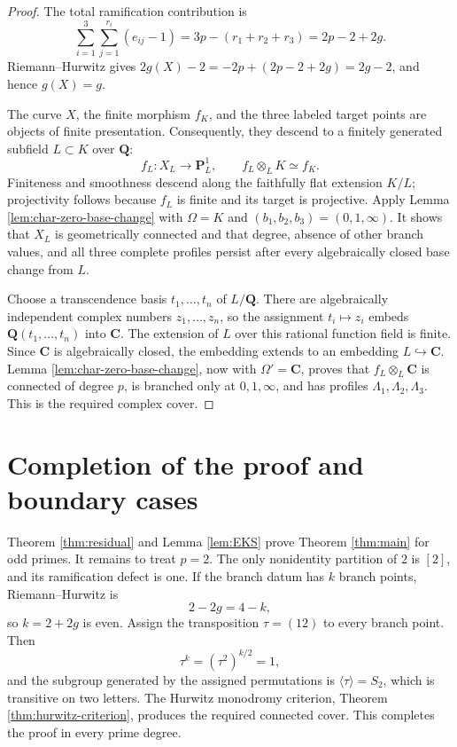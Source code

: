 \documentclass[11pt]{amsart}
\theoremstyle{plain}
\theoremstyle{definition}
\numberwithin{equation}{section}
\begin{document}
\begin{proof}
The total ramification contribution is
\[
 \sum_{i=1}^{3}\sum_{j=1}^{r_i}(e_{ij}-1)
 =3p-(r_1+r_2+r_3)=2p-2+2g.
\]
Riemann--Hurwitz gives $2g(X)-2=-2p+(2p-2+2g)=2g-2$,
and hence $g(X)=g$.

The curve $X$, the finite morphism $f_K$, and the three labeled target
points are objects of finite presentation.  Consequently, they descend to
a finitely generated subfield $L\subset K$ over $\mathbf Q$:
\[
 f_L:X_L\longrightarrow\mathbf P^1_L,
 \qquad
 f_L\otimes_L K\simeq f_K.
\]
Finiteness and smoothness descend along the faithfully flat extension
$K/L$; projectivity follows because $f_L$ is finite and its target is
projective.  Apply Lemma \ref{lem:char-zero-base-change} with
$\Omega=K$ and $(b_1,b_2,b_3)=(0,1,\infty)$.  It shows that $X_L$ is
geometrically connected and that degree, absence of other branch values,
and all three complete profiles persist after every algebraically closed
base change from $L$.

Choose a transcendence basis $t_1,\ldots,t_n$ of $L/\mathbf Q$.  There are
algebraically independent complex numbers $z_1,\ldots,z_n$, so the
assignment $t_i\mapsto z_i$ embeds
$\mathbf Q(t_1,\ldots,t_n)$ into $\mathbf C$.  The extension of $L$ over
this rational function field is finite.  Since $\mathbf C$ is algebraically
closed, the embedding extends to an embedding $L\hookrightarrow\mathbf C$.
Lemma \ref{lem:char-zero-base-change}, now with $\Omega'=\mathbf C$, proves
that $f_L\otimes_L\mathbf C$ is connected of degree $p$, is branched only
at $0,1,\infty$, and has profiles
$\Lambda_1,\Lambda_2,\Lambda_3$.  This is the required complex cover.
\end{proof}

\section{Completion of the proof and boundary cases}

Theorem \ref{thm:residual} and Lemma \ref{lem:EKS} prove Theorem
\ref{thm:main} for odd primes.  It remains to treat $p=2$.  The only
nonidentity partition of $2$ is $[2]$, and its ramification defect is one.
If the branch datum has $k$ branch points, Riemann--Hurwitz is
\[
 2-2g=4-k,
\]
so $k=2+2g$ is even.  Assign the transposition $\tau=(12)$ to every branch
point.  Then
\[
 \tau^k=(\tau^2)^{k/2}=1,
\]
and the subgroup generated by the assigned permutations is
$\langle\tau\rangle=S_2$, which is transitive on two letters.  The Hurwitz
monodromy criterion, Theorem \ref{thm:hurwitz-criterion}, produces the
required connected cover.  This completes the proof in every prime degree.
\end{document}

